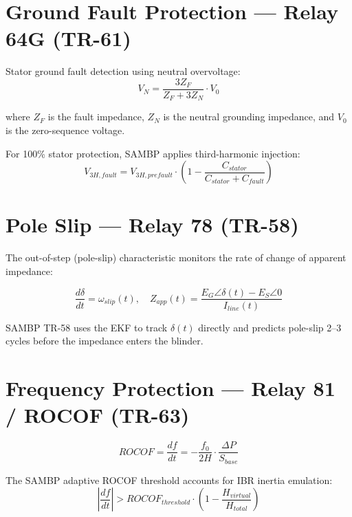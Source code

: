\documentclass[11pt,a4paper]{report}
\begin{document}
\section{Ground Fault Protection — Relay 64G (TR-61)}

Stator ground fault detection using neutral overvoltage:
\begin{equation}
\label{eq:64g}
V_N = \frac{3Z_F}{Z_F + 3Z_N}\cdot V_0
\end{equation}

where $Z_F$ is the fault impedance, $Z_N$ is the neutral grounding impedance, and $V_0$ is the zero-sequence voltage.

For 100\% stator protection, SAMBP applies third-harmonic injection:
\begin{equation}
V_{3H,fault} = V_{3H,prefault}\cdot\left(1 - \frac{C_{stator}}{C_{stator}+C_{fault}}\right)
\end{equation}

\section{Pole Slip — Relay 78 (TR-58)}

The out-of-step (pole-slip) characteristic monitors the rate of change of apparent impedance:

\begin{equation}
\label{eq:poleslip}
\frac{d\delta}{dt} = \omega_{slip}(t),\quad Z_{app}(t) = \frac{E_G\angle\delta(t) - E_S\angle 0}{I_{line}(t)}
\end{equation}

SAMBP TR-58 uses the EKF to track $\delta(t)$ directly and predicts pole-slip 2--3 cycles before the impedance enters the blinder.

\section{Frequency Protection — Relay 81 / ROCOF (TR-63)}

\begin{equation}
\label{eq:rocof}
ROCOF = \frac{df}{dt} = -\frac{f_0}{2H}\cdot\frac{\Delta P}{S_{base}}
\end{equation}

The SAMBP adaptive ROCOF threshold accounts for IBR inertia emulation:
\begin{equation}
\left|\frac{df}{dt}\right| > ROCOF_{threshold}\cdot\left(1 - \frac{H_{virtual}}{H_{total}}\right)
\end{equation}
\end{document}
